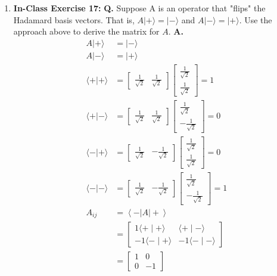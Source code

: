 \documentclass[main.tex]{subfiles}
\begin{document}
\begin{enumerate}
\item[] \textbf{In-Class Exercise 17:} \textbf{Q.} Suppose A is an operator that "flips" the Hadamard basis vectors. That is, $A|+\rangle=|-\rangle$ and $A|-\rangle=|+\rangle$. Use the approach above to derive the matrix for $A$. \textbf{A.}
    \begin{align*}
        A|+\rangle          & = |-\rangle \\
        A|-\rangle          & = |+\rangle \\
        \langle+|+\rangle   & = \left[\begin{array}{ll} \frac{1}{\sqrt{2}} & \frac{1}{\sqrt{2}} \end{array}\right] \left[\begin{array}{c} \frac{1}{\sqrt{2}} \\ \frac{1}{\sqrt{2}} \end{array}\right] = 1\\
        \langle+|-\rangle   & = \left[\begin{array}{ll} \frac{1}{\sqrt{2}} & \frac{1}{\sqrt{2}} \end{array}\right] \left[\begin{array}{c} \frac{1}{\sqrt{2}} \\ -\frac{1}{\sqrt{2}} \end{array}\right] = 0 \\
        \langle-|+\rangle   & = \left[\begin{array}{ll} \frac{1}{\sqrt{2}} & -\frac{1}{\sqrt{2}} \end{array}\right] \left[\begin{array}{c} \frac{1}{\sqrt{2}} \\ \frac{1}{\sqrt{2}} \end{array}\right] = 0 \\
        \langle-|-\rangle   & = \left[\begin{array}{ll} \frac{1}{\sqrt{2}} & -\frac{1}{\sqrt{2}} \end{array}\right] \left[\begin{array}{c} \frac{1}{\sqrt{2}} \\ -\frac{1}{\sqrt{2}} \end{array}\right] = 1 \\
        A_{i j}     &= \left\langle - |A| + \right\rangle\\
                    & = \left[\begin{array}{ll} 1 \langle + \mid + \rangle & \langle + \mid - \rangle \\ -1 \langle - \mid + \rangle & -1 \langle - \mid - \rangle \end{array}\right] \tag{missing something}\\
                    & = \left[\begin{array}{ll} 1 & 0 \\ 0 & -1 \end{array}\right]
    \end{align*}
    

\end{enumerate}
\end{document}
